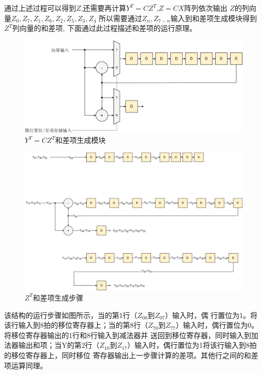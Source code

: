 \documentclass{article}
\numberwithin {equation}{section}
\begin{document}
\begin{spacing}{1.25}
        通过上述过程可以得到$Z$,还需要再计算$Y^{T}=CZ^{T}$,$Z=CX$阵列依次输出
        $Z$的列向量$Z_{0},Z_{7},Z_{1},Z_{6},Z_{2},Z_{5},Z_{3},Z_{4}$
        所以需要通过$Z_{n},Z_{7-n}$输入到和差项生成模块得到$Z^{T}$列向量的和差项,
        下面通过此过程描述和差项的运行原理。
        \begin{figure}[H]
          \centering
          \includegraphics[scale=0.8]{./pictures/和差项生成.png}
          \caption{$Y^{T}=CZ^{T}$和差项生成模块}
          \label{和差项生成}
        \end{figure}
        \begin{figure}[H]
          \centering
          \includegraphics[scale=0.8]{./pictures/和差项生成步骤.png}
          \caption{$Z^{T}$和差项生成步骤}
          \label{和差项生成步骤}
        \end{figure}

        该结构的运行步骤如图所示，当的第1行（$Z_{00}$到$Z_{07}$）输入时，偶
        行置位为1。将该行输入到8拍的移位寄存器上；当的第8行（$Z_{70}$到$Z_{
        77}$）输入时，偶行置位为0。将移位寄存器输出的1行和8行输入到减法器并
        送回到移位寄存器，同时输入到加法器输出和项；当Y的第2行（$Z_{10}$到$
        Z_{17}$）输入时，偶行置位为1将该行输入到8拍的移位寄存器上，同时移位
        寄存器输出上一步骤计算的差项。其他行之间的和差项运算同理。

\end{spacing}
\end{document}

